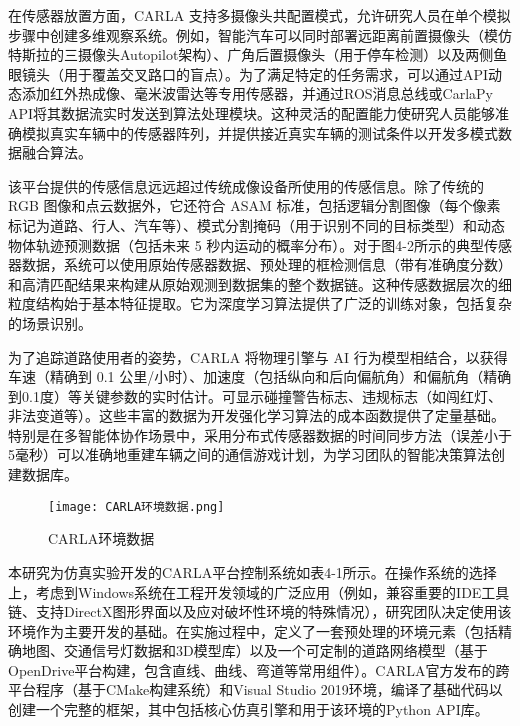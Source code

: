 在传感器放置方面，CARLA 支持多摄像头共配置模式，允许研究人员在单个模拟步骤中创建多维观察系统。例如，智能汽车可以同时部署远距离前置摄像头（模仿特斯拉的三摄像头Autopilot架构）、广角后置摄像头（用于停车检测）以及两侧鱼眼镜头（用于覆盖交叉路口的盲点）。为了满足特定的任务需求，可以通过API动态添加红外热成像、毫米波雷达等专用传感器，并通过ROS消息总线或CarlaPy API将其数据流实时发送到算法处理模块。这种灵活的配置能力使研究人员能够准确模拟真实车辆中的传感器阵列，并提供接近真实车辆的测试条件以开发多模式数据融合算法。

该平台提供的传感信息远远超过传统成像设备所使用的传感信息。除了传统的 RGB 图像和点云数据外，它还符合 ASAM 标准，包括逻辑分割图像（每个像素标记为道路、行人、汽车等）、模式分割掩码（用于识别不同的目标类型）和动态物体轨迹预测数据（包括未来 5 秒内运动的概率分布）。对于图4-2所示的典型传感器数据，系统可以使用原始传感器数据、预处理的框检测信息（带有准确度分数）和高清匹配结果来构建从原始观测到数据集的整个数据链。这种传感数据层次的细粒度结构始于基本特征提取。它为深度学习算法提供了广泛的训练对象，包括复杂的场景识别。

为了追踪道路使用者的姿势，CARLA 将物理引擎与 AI 行为模型相结合，以获得车速（精确到 0.1 公里/小时）、加速度（包括纵向和后向偏航角）和偏航角（精确到0.1度）等关键参数的实时估计。可显示碰撞警告标志、违规标志（如闯红灯、非法变道等）。这些丰富的数据为开发强化学习算法的成本函数提供了定量基础。特别是在多智能体协作场景中，采用分布式传感器数据的时间同步方法（误差小于5毫秒）可以准确地重建车辆之间的通信游戏计划，为学习团队的智能决策算法创建数据库。

\begin{figure}[hbt]
	\centering
	\texttt{[image: CARLA环境数据.png]}
	\caption{CARLA环境数据}
	\label{f.example}
\end{figure}

本研究为仿真实验开发的CARLA平台控制系统如表4-1所示。在操作系统的选择上，考虑到Windows系统在工程开发领域的广泛应用（例如，兼容重要的IDE工具链、支持DirectX图形界面以及应对破坏性环境的特殊情况），研究团队决定使用该环境作为主要开发的基础。在实施过程中，定义了一套预处理的环境元素（包括精确地图、交通信号灯数据和3D模型库）以及一个可定制的道路网络模型（基于OpenDrive平台构建，包含直线、曲线、弯道等常用组件）。CARLA官方发布的跨平台程序（基于CMake构建系统）和Visual Studio 2019环境，编译了基础代码以创建一个完整的框架，其中包括核心仿真引擎和用于该环境的Python API库。

